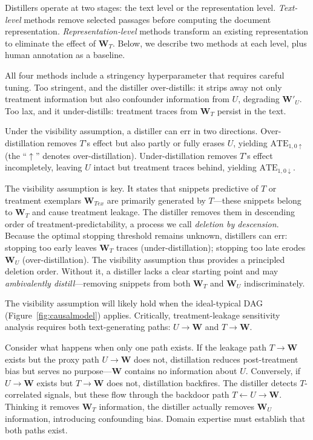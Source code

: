 \documentclass[11pt]{article}
\newcommand{\bW}{\bm{W}}  %
\begin{document}
Distillers operate at two stages: the text level or the representation level. \emph{Text-level} methods remove selected passages before computing the document representation. \emph{Representation-level} methods transform an existing representation to eliminate the effect of $\bW_T$. Below, we describe two methods at each level, plus human annotation as a baseline.

All four methods include a stringency hyperparameter that requires careful tuning. Too stringent, and the distiller over-distills: it strips away not only treatment information but also confounder information from $U$, degrading $\bm{W'}_U$. Too lax, and it under-distills: treatment traces from $\bW_T$ persist in the text.

Under the visibility assumption, a distiller can err in two directions. Over-distillation removes $T$'s effect but also partly or fully erases $U$, yielding $\textrm{ATE}_{1,0\uparrow}$ (the ``$\uparrow$'' denotes over-distillation). Under-distillation removes $T$'s effect incompletely, leaving $U$ intact but treatment traces behind, yielding $\textrm{ATE}_{1,0\downarrow}$.

The visibility assumption is key. It states that snippets predictive of $T$ or treatment exemplars $\bW_{Tex}$ are primarily generated by $T$---these snippets belong to $\bW_T$ and cause treatment leakage. The distiller removes them in descending order of treatment-predictability, a process we call \textit{deletion by descension}. Because the optimal stopping threshold remains unknown, distillers can err: stopping too early leaves $\bW_T$ traces (under-distillation); stopping too late erodes $\bW_U$ (over-distillation). The visibility assumption thus provides a principled deletion order. Without it, a distiller lacks a clear starting point and may \textit{ambivalently distill}---removing snippets from both $\bW_T$ and $\bW_U$ indiscriminately.

The visibility assumption will likely hold when the ideal-typical DAG (Figure~\ref{fig:causalmodel}) applies. Critically, treatment-leakage sensitivity analysis requires both text-generating paths: $U \to \bW$ and $T \to \bW$.

Consider what happens when only one path exists. If the leakage path $T \to \bW$ exists but the proxy path $U \to \bW$ does not, distillation reduces post-treatment bias but serves no purpose---$\bW$ contains no information about $U$. Conversely, if $U \to \bW$ exists but $T \to \bW$ does not, distillation backfires. The distiller detects $T$-correlated signals, but these flow through the backdoor path $T \leftarrow U \rightarrow \bW$. Thinking it removes $\bW_T$ information, the distiller actually removes $\bW_U$ information, introducing confounding bias. Domain expertise must establish that both paths exist.
\end{document}
